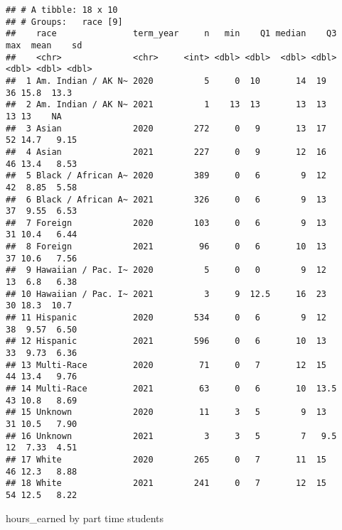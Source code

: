 \documentclass[]{article}
\newenvironment{Shaded}{\begin{snugshade}}{\end{snugshade}}
\newcommand{\DataTypeTok}[1]{\textcolor[rgb]{0.13,0.29,0.53}{#1}}
\newcommand{\FloatTok}[1]{\textcolor[rgb]{0.00,0.00,0.81}{#1}}
\newcommand{\KeywordTok}[1]{\textcolor[rgb]{0.13,0.29,0.53}{\textbf{#1}}}
\newcommand{\NormalTok}[1]{#1}
\newcommand{\OperatorTok}[1]{\textcolor[rgb]{0.81,0.36,0.00}{\textbf{#1}}}
\newcommand{\StringTok}[1]{\textcolor[rgb]{0.31,0.60,0.02}{#1}}
\begin{document}
\begin{verbatim}
## # A tibble: 18 x 10
## # Groups:   race [9]
##    race               term_year     n   min    Q1 median    Q3   max  mean    sd
##    <chr>              <chr>     <int> <dbl> <dbl>  <dbl> <dbl> <dbl> <dbl> <dbl>
##  1 Am. Indian / AK N~ 2020          5     0  10       14  19      36 15.8  13.3 
##  2 Am. Indian / AK N~ 2021          1    13  13       13  13      13 13    NA   
##  3 Asian              2020        272     0   9       13  17      52 14.7   9.15
##  4 Asian              2021        227     0   9       12  16      46 13.4   8.53
##  5 Black / African A~ 2020        389     0   6        9  12      42  8.85  5.58
##  6 Black / African A~ 2021        326     0   6        9  13      37  9.55  6.53
##  7 Foreign            2020        103     0   6        9  13      31 10.4   6.44
##  8 Foreign            2021         96     0   6       10  13      37 10.6   7.56
##  9 Hawaiian / Pac. I~ 2020          5     0   0        9  12      13  6.8   6.38
## 10 Hawaiian / Pac. I~ 2021          3     9  12.5     16  23      30 18.3  10.7 
## 11 Hispanic           2020        534     0   6        9  12      38  9.57  6.50
## 12 Hispanic           2021        596     0   6       10  13      33  9.73  6.36
## 13 Multi-Race         2020         71     0   7       12  15      44 13.4   9.76
## 14 Multi-Race         2021         63     0   6       10  13.5    43 10.8   8.69
## 15 Unknown            2020         11     3   5        9  13      31 10.5   7.90
## 16 Unknown            2021          3     3   5        7   9.5    12  7.33  4.51
## 17 White              2020        265     0   7       11  15      46 12.3   8.88
## 18 White              2021        241     0   7       12  15      54 12.5   8.22
\end{verbatim}

hours\_earned by part time students

\begin{Shaded}
\end{Shaded}
\end{document}
